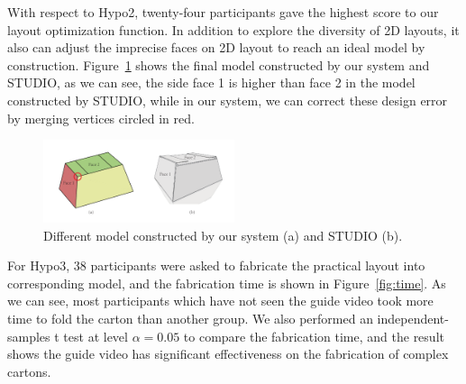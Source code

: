 With respect to Hypo2, twenty-four participants gave the highest score to our layout optimization function. In addition to explore the diversity of 2D layouts, it also can adjust the imprecise faces on 2D layout to reach an ideal model by construction. Figure~\ref{fig:correction} shows the final model constructed by our system and STUDIO, as we can see, the side face 1 is higher than face 2 in the model constructed by STUDIO, while in our system, we can correct these design error by merging vertices circled in red.

\begin{figure}
	\centering
	\includegraphics[width=0.5\textwidth]{images/comparison}
	\caption{Different model constructed by our system (a) and STUDIO (b). }
	\label{fig:correction}
\end{figure}

For Hypo3, 38 participants were asked to fabricate the practical layout into corresponding model, and the fabrication time is shown in Figure~\ref{fig:time}. As we can see, most participants which have not seen the guide video took more time to fold the carton than another group. We also performed an independent-samples t test at level $\alpha = 0.05$ to compare the fabrication time, and the result shows the guide video has significant effectiveness on the fabrication of complex cartons.




